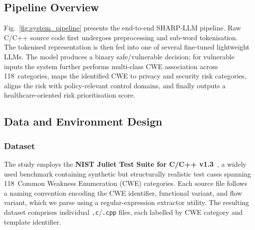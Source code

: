 \documentclass[conference]{IEEEtran}
\begin{document}
\subsection{Pipeline Overview}
\label{sec:pipeline}

Fig.~\ref{fig:system_pipeline} presents the end-to-end SHARP-LLM pipeline.
Raw C/C++ source code first undergoes preprocessing and sub-word
tokenisation.  The tokenised representation is then fed into one of several
fine-tuned lightweight LLMs.  The model produces a binary safe/vulnerable
decision; for vulnerable inputs the system further performs multi-class CWE
association across 118~categories, maps the identified CWE to privacy and
security risk categories, aligns the risk with policy-relevant control
domains, and finally outputs a healthcare-oriented risk prioritisation
score.

\subsection{Data and Environment Design}
\label{sec:data_design}

\subsubsection{Dataset}
The study employs the \textbf{NIST Juliet Test Suite for C/C++ v1.3}~\cite{juliet2017}, a widely used benchmark containing synthetic but
structurally realistic test cases spanning 118~Common Weakness Enumeration
(CWE) categories.  Each source file follows a naming convention encoding the
CWE identifier, functional variant, and flow variant, which we parse using a
regular-expression extractor utility.  The resulting dataset comprises individual \texttt{.c}/\texttt{.cpp}
files, each labelled by CWE category and template identifier.
\end{document}

